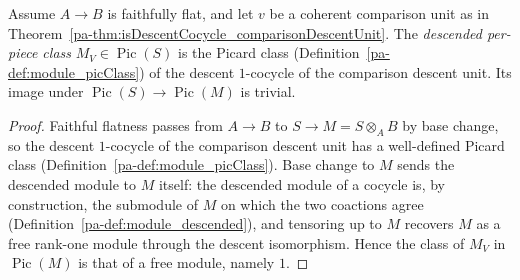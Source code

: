 \begin{definition}
  \label{pa-def:comparisonDescentClass}
  \leanok

  Assume \(A \to B\) is faithfully flat, and let \(v\) be a coherent comparison unit as in
  Theorem~\ref{pa-thm:isDescentCocycle_comparisonDescentUnit}. The \emph{descended per-piece class}
  \(M_V \in \operatorname{Pic}(S)\) is the Picard class (Definition~\ref{pa-def:module_picClass}) of the
  descent \(1\)-cocycle of the comparison descent unit. Its image under \(\operatorname{Pic}(S) \to
  \operatorname{Pic}(M)\) is trivial.
\end{definition}
\begin{proof}
  \leanok
  Faithful flatness passes from \(A \to B\) to \(S \to M = S \otimes_A B\) by base change, so the
  descent \(1\)-cocycle of the comparison descent unit has a well-defined Picard class
  (Definition~\ref{pa-def:module_picClass}). Base change to \(M\) sends the descended module to \(M\)
  itself: the descended module of a cocycle is, by construction, the submodule of \(M\) on which the
  two coactions agree (Definition~\ref{pa-def:module_descended}), and tensoring up to \(M\) recovers
  \(M\) as a free rank-one module through the descent isomorphism. Hence the class of \(M_V\) in
  \(\operatorname{Pic}(M)\) is that of a free module, namely \(1\).
\end{proof}

